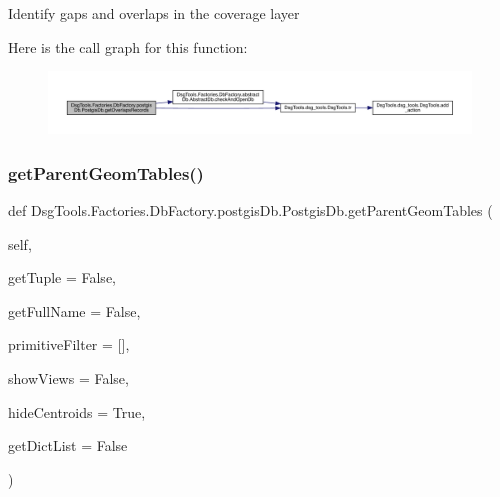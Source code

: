 \begin{DoxyVerb}Identify gaps and overlaps in the coverage layer
\end{DoxyVerb}
 Here is the call graph for this function\+:
\nopagebreak
\begin{figure}[H]
\begin{center}
\leavevmode
\includegraphics[width=350pt]{class_dsg_tools_1_1_factories_1_1_db_factory_1_1postgis_db_1_1_postgis_db_ad78e09592b69cb6c6c4ff584d56f4c4d_cgraph}
\end{center}
\end{figure}
\mbox{\label{class_dsg_tools_1_1_factories_1_1_db_factory_1_1postgis_db_1_1_postgis_db_ada0c13dfb9ad99d13ac630e4b0830778}} 
\subsubsection{\texorpdfstring{get\+Parent\+Geom\+Tables()}{getParentGeomTables()}}
{\footnotesize\ttfamily def Dsg\+Tools.\+Factories.\+Db\+Factory.\+postgis\+Db.\+Postgis\+Db.\+get\+Parent\+Geom\+Tables (\begin{DoxyParamCaption}\item[{}]{self,  }\item[{}]{get\+Tuple = {\ttfamily False},  }\item[{}]{get\+Full\+Name = {\ttfamily False},  }\item[{}]{primitive\+Filter = {\ttfamily \mbox{[}\mbox{]}},  }\item[{}]{show\+Views = {\ttfamily False},  }\item[{}]{hide\+Centroids = {\ttfamily True},  }\item[{}]{get\+Dict\+List = {\ttfamily False} }\end{DoxyParamCaption})}

